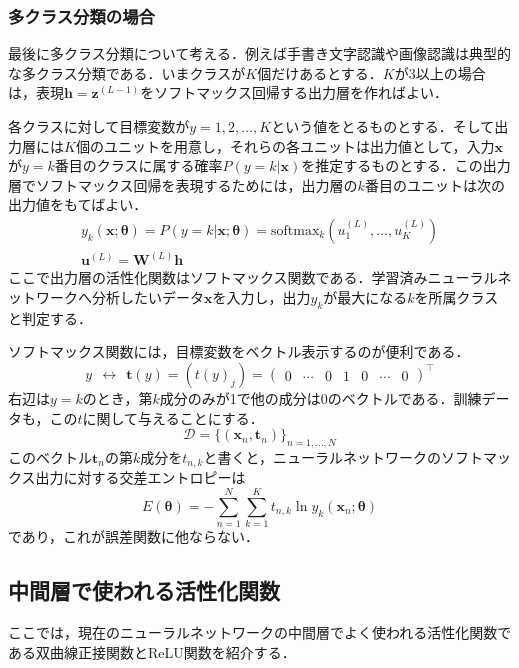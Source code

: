 \documentclass[a4paper,11pt]{jsreport}
\begin{document}
\subsubsection*{多クラス分類の場合}
最後に多クラス分類について考える．例えば手書き文字認識や画像認識は典型的な多クラス分類である．いまクラスが$K$個だけあるとする．$K$が3以上の場合は，表現$\bm{h}=\bm{z}^{(L-1)}$をソフトマックス回帰する出力層を作ればよい．\par
各クラスに対して目標変数が$y=1,2,\dots,K$という値をとるものとする．そして出力層には$K$個のユニットを用意し，それらの各ユニットは出力値として，入力$\bm{x}$が$y=k$番目のクラスに属する確率$P(y=k | \bm{x})$を推定するものとする．この出力層でソフトマックス回帰を表現するためには，出力層の$k$番目のユニットは次の出力値をもてばよい．
\begin{align}
  y_k(\bm{x}; \bm{\theta}) = P(y=k | \bm{x}; \bm{\theta})
  = \text{softmax}_k \left( u_1^{(L)},\dots ,u_K^{(L)} \right) \\
  \bm{u}^{(L)} = \bm{W}^{(L)} \bm{h}
\end{align}
ここで出力層の活性化関数はソフトマックス関数である．学習済みニューラルネットワークへ分析したいデータ$\bm{x}$を入力し，出力$y_k$が最大になる$k$を所属クラスと判定する．\par
ソフトマックス関数には，目標変数をベクトル表示するのが便利である．
\begin{equation}
  y \ \ \longleftrightarrow \ \
  \bm{t}(y)
  = (t(y)_j)
  = \begin{pmatrix}
    0 & \cdots & 0 & 1 & 0 & \cdots & 0
  \end{pmatrix}^{\top}
\end{equation}
右辺は$y=k$のとき，第$k$成分のみが1で他の成分は0のベクトルである．訓練データも，この$t$に関して与えることにする．
\begin{equation}
  \mathcal{D}
  = \{ (\bm{x}_n, \bm{t}_n) \}_{n=1,\dots,N}
\end{equation}
このベクトル$\bm{t}_n$の第$k$成分を$t_{n,k}$と書くと，ニューラルネットワークのソフトマックス出力に対する交差エントロピーは
\begin{equation}
  E(\bm{\theta}) = -\sum_{n=1}^N \sum_{k=1}^K t_{n,k} \ln{y_k}(\bm{x}_n; \bm{\theta})
\end{equation}
であり，これが誤差関数に他ならない．

\subsection{中間層で使われる活性化関数}
ここでは，現在のニューラルネットワークの中間層でよく使われる活性化関数である双曲線正接関数とReLU関数を紹介する．\par
\end{document}

